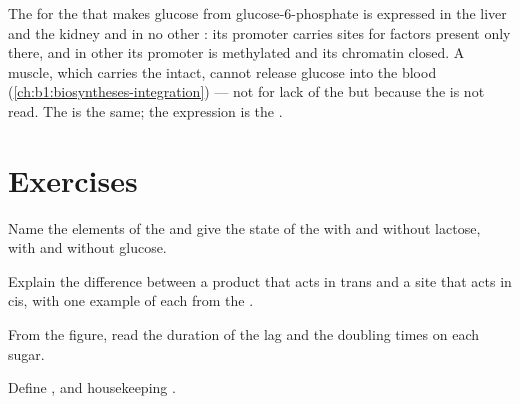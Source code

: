 \begin{example}\label{ex:b1:expression-control:twoorgans}
The  for the  that makes glucose from glucose-6-phosphate
is expressed in the liver and the kidney and in no other : its
promoter carries sites for factors present only there, and in other
 its promoter is methylated and its chromatin closed. A muscle,
which carries the  intact, cannot release glucose into the blood
(\cref{ch:b1:biosyntheses-integration}) --- not for lack of the 
but because the  is not read. The  is the same; the
expression is the .
\end{example}

\section{Exercises}

\begin{exercise}[$\star$]\label{exo:b1:expression-control:1}
Name the elements of the  and give the state of the 
with and without lactose, with and without glucose.
\end{exercise}

\begin{exercise}[$\star$]\label{exo:b1:expression-control:2}
Explain the difference between a  product that acts in trans and
a site that acts in cis, with one example of each from the .
\end{exercise}

\begin{exercise}[$\star$]\label{exo:b1:expression-control:3}
From the  figure, read the duration of the lag and the
doubling times on each sugar.
\end{exercise}

\begin{exercise}[$\star$]\label{exo:b1:expression-control:4}
Define ,  and housekeeping .
\end{exercise}

